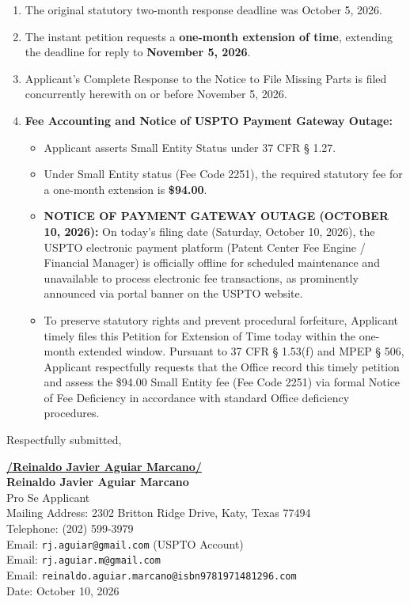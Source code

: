 \documentclass[11pt,letterpaper]{article}
\begin{document}
\begin{enumerate}[leftmargin=2em, itemsep=4pt]
    \item The original statutory two-month response deadline was October 5, 2026.
    \item The instant petition requests a \textbf{one-month extension of time}, extending the deadline for reply to \textbf{November 5, 2026}.
    \item Applicant's Complete Response to the Notice to File Missing Parts is filed concurrently herewith on or before November 5, 2026.
    \item \textbf{Fee Accounting and Notice of USPTO Payment Gateway Outage:} 
    \begin{itemize}
        \item Applicant asserts Small Entity Status under 37 CFR \S{} 1.27.
        \item Under Small Entity status (Fee Code 2251), the required statutory fee for a one-month extension is \textbf{\$94.00}.
        \item \textbf{NOTICE OF PAYMENT GATEWAY OUTAGE (OCTOBER 10, 2026):} On today's filing date (Saturday, October 10, 2026), the USPTO electronic payment platform (Patent Center Fee Engine / Financial Manager) is officially offline for scheduled maintenance and unavailable to process electronic fee transactions, as prominently announced via portal banner on the USPTO website.
        \item To preserve statutory rights and prevent procedural forfeiture, Applicant timely files this Petition for Extension of Time today within the one-month extended window. Pursuant to 37 CFR \S{} 1.53(f) and MPEP \S{} 506, Applicant respectfully requests that the Office record this timely petition and assess the \$94.00 Small Entity fee (Fee Code 2251) via formal Notice of Fee Deficiency in accordance with standard Office deficiency procedures.
    \end{itemize}
\end{enumerate}

\vspace{0.8cm}
\begin{singlespace}
\noindent Respectfully submitted, \par\vspace{1.2cm}
\underline{\textbf{/Reinaldo Javier Aguiar Marcano/}} \\
\textbf{Reinaldo Javier Aguiar Marcano} \\
Pro Se Applicant \\
Mailing Address: 2302 Britton Ridge Drive, Katy, Texas 77494 \\
Telephone: (202) 599-3979 \\
Email: \texttt{rj.aguiar@gmail.com} (USPTO Account) \\
Email: \texttt{rj.aguiar.m@gmail.com} \\
Email: \texttt{reinaldo.aguiar.marcano@isbn9781971481296.com} \\
Date: October 10, 2026
\end{singlespace}
\end{document}
